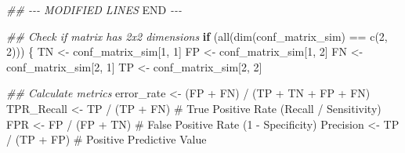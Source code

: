 \documentclass[
  letterpaper,
]{scrbook}
\newenvironment{Shaded}{\begin{snugshade}}{\end{snugshade}}
\newcommand{\CommentTok}[1]{\textcolor[rgb]{0.37,0.37,0.37}{#1}}
\newcommand{\ControlFlowTok}[1]{\textcolor[rgb]{0.00,0.23,0.31}{\textbf{#1}}}
\newcommand{\DecValTok}[1]{\textcolor[rgb]{0.68,0.00,0.00}{#1}}
\newcommand{\DocumentationTok}[1]{\textcolor[rgb]{0.37,0.37,0.37}{\textit{#1}}}
\newcommand{\FunctionTok}[1]{\textcolor[rgb]{0.28,0.35,0.67}{#1}}
\newcommand{\NormalTok}[1]{\textcolor[rgb]{0.00,0.23,0.31}{#1}}
\newcommand{\OtherTok}[1]{\textcolor[rgb]{0.00,0.23,0.31}{#1}}
\newcommand{\RegionMarkerTok}[1]{\textcolor[rgb]{0.00,0.23,0.31}{#1}}
\newcommand{\SpecialCharTok}[1]{\textcolor[rgb]{0.37,0.37,0.37}{#1}}
\begin{document}
\begin{Shaded}
\begin{Highlighting}[]
\DocumentationTok{\#\# {-}{-}{-} MODIFIED LINES }\RegionMarkerTok{END}\DocumentationTok{ {-}{-}{-}}


\DocumentationTok{\#\# Check if matrix has 2x2 dimensions}
\ControlFlowTok{if}\NormalTok{ (}\FunctionTok{all}\NormalTok{(}\FunctionTok{dim}\NormalTok{(conf\_matrix\_sim) }\SpecialCharTok{==} \FunctionTok{c}\NormalTok{(}\DecValTok{2}\NormalTok{, }\DecValTok{2}\NormalTok{))) \{}
\NormalTok{  TN }\OtherTok{\textless{}{-}}\NormalTok{ conf\_matrix\_sim[}\DecValTok{1}\NormalTok{, }\DecValTok{1}\NormalTok{]}
\NormalTok{  FP }\OtherTok{\textless{}{-}}\NormalTok{ conf\_matrix\_sim[}\DecValTok{1}\NormalTok{, }\DecValTok{2}\NormalTok{]}
\NormalTok{  FN }\OtherTok{\textless{}{-}}\NormalTok{ conf\_matrix\_sim[}\DecValTok{2}\NormalTok{, }\DecValTok{1}\NormalTok{]}
\NormalTok{  TP }\OtherTok{\textless{}{-}}\NormalTok{ conf\_matrix\_sim[}\DecValTok{2}\NormalTok{, }\DecValTok{2}\NormalTok{]}

  \DocumentationTok{\#\# Calculate metrics}
\NormalTok{  error\_rate }\OtherTok{\textless{}{-}}\NormalTok{ (FP }\SpecialCharTok{+}\NormalTok{ FN) }\SpecialCharTok{/}\NormalTok{ (TP }\SpecialCharTok{+}\NormalTok{ TN }\SpecialCharTok{+}\NormalTok{ FP }\SpecialCharTok{+}\NormalTok{ FN)}
\NormalTok{  TPR\_Recall }\OtherTok{\textless{}{-}}\NormalTok{ TP }\SpecialCharTok{/}\NormalTok{ (TP }\SpecialCharTok{+}\NormalTok{ FN) }\CommentTok{\# True Positive Rate (Recall / Sensitivity)}
\NormalTok{  FPR }\OtherTok{\textless{}{-}}\NormalTok{ FP }\SpecialCharTok{/}\NormalTok{ (FP }\SpecialCharTok{+}\NormalTok{ TN)      }\CommentTok{\# False Positive Rate (1 {-} Specificity)}
\NormalTok{  Precision }\OtherTok{\textless{}{-}}\NormalTok{ TP }\SpecialCharTok{/}\NormalTok{ (TP }\SpecialCharTok{+}\NormalTok{ FP)  }\CommentTok{\# Positive Predictive Value}


\end{Highlighting}
\end{Shaded}
\end{document}
